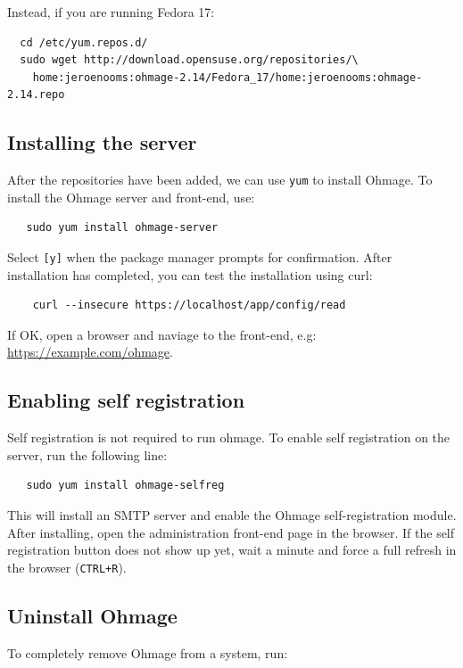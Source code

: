 \documentclass{scrartcl}
\begin{document}
\noindent Instead, if you are running Fedora 17:

\begin{verbatim}
  cd /etc/yum.repos.d/
  sudo wget http://download.opensuse.org/repositories/\
    home:jeroenooms:ohmage-2.14/Fedora_17/home:jeroenooms:ohmage-2.14.repo
\end{verbatim}

\subsection{Installing the server}

After the repositories have been added, we can use \texttt{yum} to install
Ohmage. To install the Ohmage server and front-end, use:

\begin{verbatim}
   sudo yum install ohmage-server
\end{verbatim}

\noindent Select \texttt{[y]} when the package manager prompts for confirmation.
After installation has completed, you can test the installation using curl:

\begin{verbatim}
    curl --insecure https://localhost/app/config/read
\end{verbatim}

\noindent If OK, open a browser and naviage to the front-end, e.g:
\url{https://example.com/ohmage}.

\subsection{Enabling self registration}

Self registration is not required to run ohmage. To enable self registration on
the server, run the following line:
\begin{verbatim}
   sudo yum install ohmage-selfreg
\end{verbatim}
This will install an SMTP server and enable the Ohmage self-registration module.
After installing, open the administration front-end page in the browser. If the
self registration button does not show up yet, wait a minute and force a full
refresh in the browser (\texttt{CTRL+R}).

\subsection{Uninstall Ohmage}

To completely remove Ohmage from a system, run:
\end{document}
